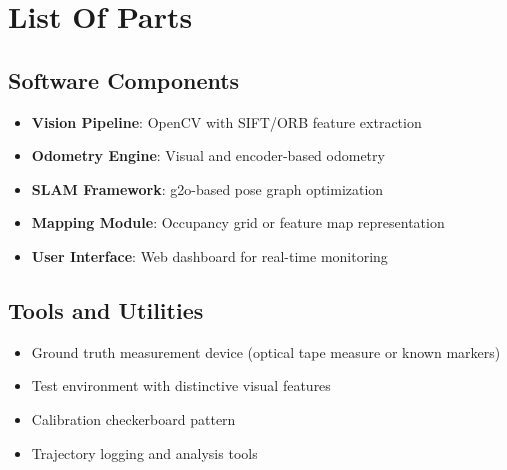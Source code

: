%
%

\chapter{List Of Parts}

\section{Software Components}

\begin{itemize}
    \item \textbf{Vision Pipeline}: OpenCV with SIFT/ORB feature extraction
    \item \textbf{Odometry Engine}: Visual and encoder-based odometry
    \item \textbf{SLAM Framework}: g2o-based pose graph optimization
    \item \textbf{Mapping Module}: Occupancy grid or feature map representation
    \item \textbf{User Interface}: Web dashboard for real-time monitoring
\end{itemize}

\section{Tools and Utilities}

\begin{itemize}
    \item Ground truth measurement device (optical tape measure or known markers)
    \item Test environment with distinctive visual features
    \item Calibration checkerboard pattern
    \item Trajectory logging and analysis tools
\end{itemize}

